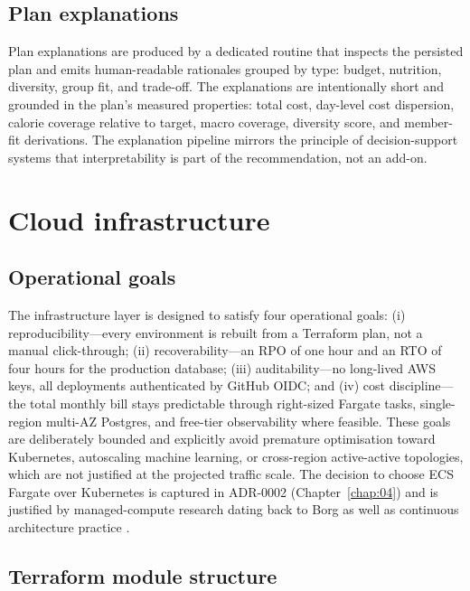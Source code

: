 \subsection{Plan explanations}

Plan explanations are produced by a dedicated routine that inspects the persisted plan and emits human-readable rationales grouped by type: budget, nutrition, diversity, group fit, and trade-off. The explanations are intentionally short and grounded in the plan's measured properties: total cost, day-level cost dispersion, calorie coverage relative to target, macro coverage, diversity score, and member-fit derivations. The explanation pipeline mirrors the principle of decision-support systems that interpretability is part of the recommendation, not an add-on.

\section{Cloud infrastructure}

\subsection{Operational goals}

The infrastructure layer is designed to satisfy four operational goals: (i) reproducibility---every environment is rebuilt from a Terraform plan, not a manual click-through; (ii) recoverability---an RPO of one hour and an RTO of four hours for the production database; (iii) auditability---no long-lived AWS keys, all deployments authenticated by GitHub OIDC; and (iv) cost discipline---the total monthly bill stays predictable through right-sized Fargate tasks, single-region multi-AZ Postgres, and free-tier observability where feasible. These goals are deliberately bounded and explicitly avoid premature optimisation toward Kubernetes, autoscaling machine learning, or cross-region active-active topologies, which are not justified at the projected traffic scale. The decision to choose ECS Fargate over Kubernetes is captured in ADR-0002 (Chapter~\ref{chap:04}) and is justified by managed-compute research dating back to Borg \cite{burns2016} as well as continuous architecture practice \cite{erder2015}.

\subsection{Terraform module structure}

